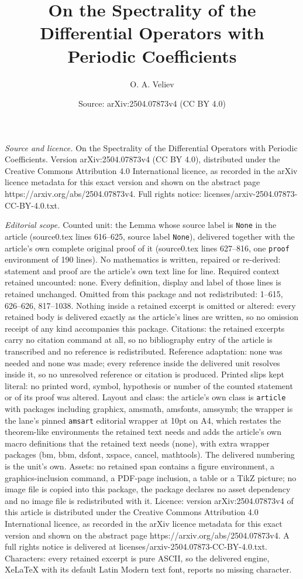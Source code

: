 \documentclass[10pt,a4paper]{amsart}
\title[On the Spectrality of the Differential Operators with Period]{On the Spectrality of the Differential Operators with Periodic Coefficients}
\author{O. A. Veliev}
\date{Source: arXiv:2504.07873v4 (CC BY 4.0)}
\begin{document}
\maketitle

\noindent\emph{Source and licence.} On the Spectrality of the Differential Operators with Periodic Coefficients. Version arXiv:2504.07873v4 (CC BY 4.0), distributed under the Creative Commons Attribution 4.0 International licence, as recorded in the arXiv licence metadata for this exact version and shown on the abstract page https://arxiv.org/abs/2504.07873v4. Full rights notice: licenses/arxiv-2504.07873-CC-BY-4.0.txt.\par\smallskip

\noindent\textit{Editorial scope.} Counted unit: the Lemma whose source label is \texttt{None} in the article (source0.tex lines 616--625, source label \texttt{None}), delivered together with the article's own complete original proof of it (source0.tex lines 627--816, one \texttt{proof} environment of 190 lines). No mathematics is written, repaired or re-derived: statement and proof are the article's own text line for line. Required context retained uncounted: none. Every definition, display and label of those lines is retained unchanged. Omitted from this package and not redistributed: 1--615, 626--626, 817--1038. Nothing inside a retained excerpt is omitted or altered: every retained body is delivered exactly as the article's lines are written, so no omission receipt of any kind accompanies this package. Citations: the retained excerpts carry no citation command at all, so no bibliography entry of the article is transcribed and no reference is redistributed. Reference adaptation: none was needed and none was made; every reference inside the delivered unit resolves inside it, so no unresolved reference or citation is produced. Printed slips kept literal: no printed word, symbol, hypothesis or number of the counted statement or of its proof was altered. Layout and class: the article's own class is \texttt{article} with packages including graphicx, amsmath, amsfonts, amssymb; the wrapper is the lane's pinned \texttt{amsart} editorial wrapper at 10pt on A4, which restates the theorem-like environments the retained text needs and adds the article's own macro definitions that the retained text needs (none), with extra wrapper packages (bm, bbm, dsfont, xspace, cancel, mathtools). The delivered numbering is the unit's own. Assets: no retained span contains a figure environment, a graphics-inclusion command, a PDF-page inclusion, a table or a TikZ picture; no image file is copied into this package, the package declares no asset dependency and no image file is redistributed with it. Licence: version arXiv:2504.07873v4 of this article is distributed under the Creative Commons Attribution 4.0 International licence, as recorded in the arXiv licence metadata for this exact version and shown on the abstract page https://arxiv.org/abs/2504.07873v4. A full rights notice is delivered at licenses/arxiv-2504.07873-CC-BY-4.0.txt. Characters: every retained excerpt is pure ASCII, so the delivered engine, XeLaTeX with its default Latin Modern text font, reports no missing character.
\end{document}
